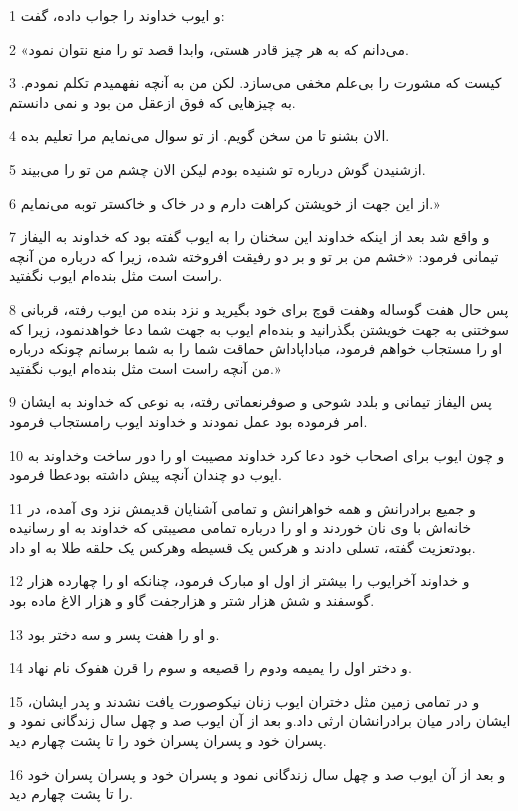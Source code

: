 \par 1 و ایوب خداوند را جواب داده، گفت:
\par 2 «می‌دانم که به هر چیز قادر هستی، وابدا قصد تو را منع نتوان نمود.
\par 3 کیست که مشورت را بی‌علم مخفی می‌سازد. لکن من به آنچه نفهمیدم تکلم نمودم. به چیزهایی که فوق ازعقل من بود و نمی دانستم.
\par 4 الان بشنو تا من سخن گویم. از تو سوال می‌نمایم مرا تعلیم بده.
\par 5 ازشنیدن گوش درباره تو شنیده بودم لیکن الان چشم من تو را می‌بیند.
\par 6 از این جهت از خویشتن کراهت دارم و در خاک و خاکستر توبه می‌نمایم.»
\par 7 و واقع شد بعد از اینکه خداوند این سخنان را به ایوب گفته بود که خداوند به الیفاز تیمانی فرمود: «خشم من بر تو و بر دو رفیقت افروخته شده، زیرا که درباره من آنچه راست است مثل بنده‌ام ایوب نگفتید.
\par 8 پس حال هفت گوساله وهفت قوچ برای خود بگیرید و نزد بنده من ایوب رفته، قربانی سوختنی به جهت خویشتن بگذرانید و بنده‌ام ایوب به جهت شما دعا خواهدنمود، زیرا که او را مستجاب خواهم فرمود، مباداپاداش حماقت شما را به شما برسانم چونکه درباره من آنچه راست است مثل بنده‌ام ایوب نگفتید.»
\par 9 پس الیفاز تیمانی و بلدد شوحی و صوفرنعماتی رفته، به نوعی که خداوند به ایشان امر فرموده بود عمل نمودند و خداوند ایوب رامستجاب فرمود.
\par 10 و چون ایوب برای اصحاب خود دعا کرد خداوند مصیبت او را دور ساخت وخداوند به ایوب دو چندان آنچه پیش داشته بودعطا فرمود.
\par 11 و جمیع برادرانش و همه خواهرانش و تمامی آشنایان قدیمش نزد وی آمده، در خانه‌اش با وی نان خوردند و او را درباره تمامی مصیبتی که خداوند به او رسانیده بودتعزیت گفته، تسلی دادند و هرکس یک قسیطه وهرکس یک حلقه طلا به او داد. 
\par 12 و خداوند آخرایوب را بیشتر از اول او مبارک فرمود، چنانکه او را چهارده هزار گوسفند و شش هزار شتر و هزارجفت گاو و هزار الاغ ماده بود.
\par 13 و او را هفت پسر و سه دختر بود.
\par 14 و دختر اول را یمیمه ودوم را قصیعه و سوم را قرن هفوک نام نهاد.
\par 15 و در تمامی زمین مثل دختران ایوب زنان نیکوصورت یافت نشدند و پدر ایشان، ایشان رادر میان برادرانشان ارثی داد.و بعد از آن ایوب صد و چهل سال زندگانی نمود و پسران خود و پسران پسران خود را تا پشت چهارم دید.
\par 16 و بعد از آن ایوب صد و چهل سال زندگانی نمود و پسران خود و پسران پسران خود را تا پشت چهارم دید.


